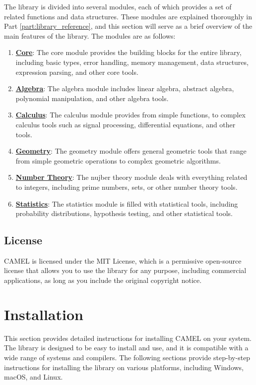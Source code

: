 \documentclass[a4paper,oneside,8pt]{extarticle}
\theoremstyle{definition}
\begin{document}
The library is divided into several modules, each of which provides a set of related functions and data structures. These modules are explained thoroughly in Part \ref{part:library_reference}, and this section will serve as a brief overview of the main features of the library. The modules are as follows:
\begin{enumerate}
  \item \textbf{\hyperref[sec:core]{Core}}: The core module provides the building blocks for the entire library, including basic types, error handling, memory management, data structures, expression parsing, and other core tools.
  \item \textbf{\hyperref[sec:algebra]{Algebra}}: The algebra module includes linear algebra, abstract algebra, polynomial manipulation, and other algebra tools.
  \item \textbf{\hyperref[sec:calculus]{Calculus}}: The calculus module provides from simple functions, to complex calculus tools such as signal processing, differential equations, and other tools.
  \item \textbf{\hyperref[sec:geometry]{Geometry}}: The geometry module offers general geometric tools that range from simple geometric operations to complex geometric algorithms.
  \item \textbf{\hyperref[sec:number_theory]{Number Theory}}: The nujber theory module deals with everything related to integers, including prime numbers, sets, or other number theory tools.
  \item \textbf{\hyperref[sec:statistics]{Statistics}}: The statistics module is filled with statistical tools, including probability distributions, hypothesis testing, and other statistical tools.
\end{enumerate}

\subsection{License}

CAMEL is licensed under the MIT License, which is a permissive open-source license that allows you to use the library for any purpose, including commercial applications, as long as you include the original copyright notice.


\section{Installation}

This section provides detailed instructions for installing CAMEL on your system. The library is designed to be easy to install and use, and it is compatible with a wide range of systems and compilers. The following sections provide step-by-step instructions for installing the library on various platforms, including Windows, macOS, and Linux.
\end{document}
